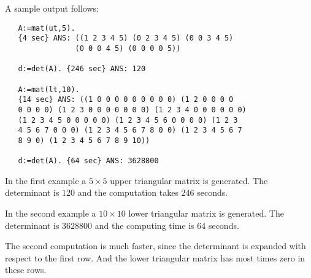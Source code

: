 A sample output follows:
\begin{verbatim}
   A:=mat(ut,5).
   {4 sec} ANS: ((1 2 3 4 5) (0 2 3 4 5) (0 0 3 4 5) 
                (0 0 0 4 5) (0 0 0 0 5))
 
   d:=det(A). {246 sec} ANS: 120

   A:=mat(lt,10).
   {14 sec} ANS: ((1 0 0 0 0 0 0 0 0 0) (1 2 0 0 0 0 
   0 0 0 0) (1 2 3 0 0 0 0 0 0 0) (1 2 3 4 0 0 0 0 0 0) 
   (1 2 3 4 5 0 0 0 0 0) (1 2 3 4 5 6 0 0 0 0) (1 2 3 
   4 5 6 7 0 0 0) (1 2 3 4 5 6 7 8 0 0) (1 2 3 4 5 6 7 
   8 9 0) (1 2 3 4 5 6 7 8 9 10))
 
   d:=det(A). {64 sec} ANS: 3628800
\end{verbatim}
In the first example a $5 \times 5$ upper triangular
matrix is generated. The determinant is $120$
and the computation takes $246$ seconds. 

In the second example a $10 \times 10$ lower triangular
matrix is generated. The determinant is $3628800$ and
the computing time is $64$ seconds. 

The second computation is much faster, since the 
determinant is expanded with respect to the 
first row. And the lower triangular matrix has 
most times zero in these rows.

